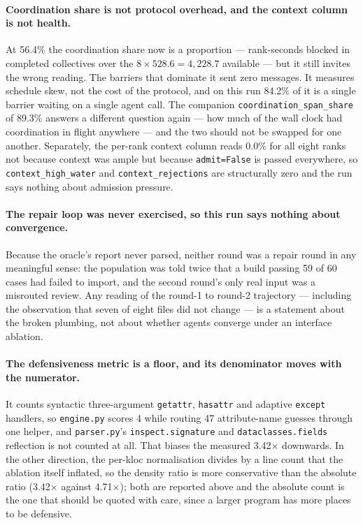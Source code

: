 \documentclass[11pt]{article}
\begin{document}
\paragraph{Coordination share is not protocol overhead, and the context column is not health.}
At 56.4\% the coordination share now is a proportion --- rank-seconds blocked in completed
collectives over the $8\times528.6=4{,}228.7$ available --- but it still invites the wrong reading.
The barriers that dominate it sent zero messages. It measures schedule skew, not the cost of the
protocol, and on this run 84.2\% of it is a single barrier waiting on a single agent call. The
companion \texttt{coordination\_span\_share} of 89.3\% answers a different question again --- how
much of the wall clock had coordination in flight anywhere --- and the two should not be swapped
for one another. Separately, the per-rank context column reads 0.0\% for all eight ranks not
because context was ample but because \texttt{admit=False} is passed everywhere, so
\texttt{context\_high\_water} and \texttt{context\_rejections} are structurally zero and the run
says nothing about admission pressure.

\paragraph{The repair loop was never exercised, so this run says nothing about convergence.} Because
the oracle's report never parsed, neither round was a repair round in any meaningful sense: the
population was told twice that a build passing 59 of 60 cases had failed to import, and the second
round's only real input was a misrouted review. Any reading of the round-1 to round-2 trajectory ---
including the observation that seven of eight files did not change --- is a statement about the
broken plumbing, not about whether agents converge under an interface ablation.

\paragraph{The defensiveness metric is a floor, and its denominator moves with the numerator.} It
counts syntactic three-argument \texttt{getattr}, \texttt{hasattr} and adaptive \texttt{except}
handlers, so \texttt{engine.py} scores 4 while routing 47 attribute-name guesses through one helper,
and \texttt{parser.py}'s \texttt{inspect.signature} and \texttt{dataclasses.fields} reflection is not
counted at all. That biases the measured 3.42$\times$ downwards. In the other direction, the
per-kloc normalisation divides by a line count that the ablation itself inflated, so the density
ratio is more conservative than the absolute ratio (3.42$\times$ against 4.71$\times$); both are
reported above and the absolute count is the one that should be quoted with care, since a larger
program has more places to be defensive.
\end{document}
